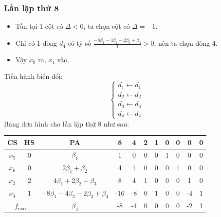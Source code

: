 \documentclass[12pt]{article}
\begin{document}
\subsubsection{Lần lặp thứ 8}
\begin{itemize}
\item Tồn tại 1 cột có $\Delta < 0$, ta chọn cột có $\Delta = -1$.
\item Chỉ có 1 dòng $d_4$ có tỷ số $\displaystyle \frac{-8\beta_1 - 4\beta_2 - 2\beta_3 + \beta_4}{1} > 0$, nên ta chọn dòng 4.
\item Vậy $x_8$ ra, $x_4$ vào.
\end{itemize}
Tiến hành biến đổi:
$$
\left\{
\begin{array}{lll}
d_1 \leftarrow d_1 \\
d_2 \leftarrow d_2\\
d_3 \leftarrow d_3\\
d_4 \leftarrow d_4
\end{array}
\right.
$$
Bảng đơn hình cho lần lặp thứ 8 như sau:
\begin{table}[H]
\centering
\begin{tabular}{|c|c|c|c|c|c|c|c|c|c|c|}
\hline
CS & HS & PA & 8 & 4 & 2 & 1 & 0 & 0 & 0 & 0 \\
\hline
$x_5$ & 0 & $\beta_1$ & 1 & 0 & 0 & 0 & 1 & 0 & 0 & 0 \\
$x_6$ & 0 & $2\beta_1 + \beta_2$ & 4 & 1 & 0 & 0 & 0 & 1 & 0 & 0 \\
$x_3$ & 2 & $4\beta_1 + 2\beta_2 + \beta_3$ & 8 & 4 & 1 & 0 & 0 & 0 & 1 & 0 \\
$x_4$ & 1 & $-8\beta_1 - 4\beta_2 - 2\beta_3 + \beta_4$ & -16 & -8 & 0 & 1 & 0 & 0 & -4 & 1 \\
\hline
\multicolumn{2}{|c|}{$f_{\max}$}
& $\beta_4$ & -8 & -4 & 0 & 0 & 0 & 0 & -2 & 1 \\
\hline
\end{tabular}
\end{table}
\end{document}
